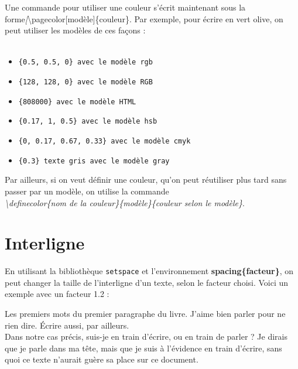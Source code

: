 \documentclass[a4paper, 10pt]{book}
\begin{document}
Une commande pour utiliser une couleur s'écrit maintenant sous la forme\textit[{\textbackslash pagecolor[modèle]\{couleur\}}. Par exemple, pour écrire en vert olive,  on peut utiliser les modèles de ces façons : \\ \\

\begin{itemize}
\item \textcolor[rgb]{0.5, 0.5, 0}{\texttt{\{0.5, 0.5, 0\} avec le modèle rgb}}
\item \textcolor[RGB]{128, 128, 0}{\texttt{\{128, 128, 0\} avec le modèle RGB}}
\item \textcolor[HTML]{808000}{\texttt{\{808000\} avec le modèle HTML}}
\item \textcolor[hsb]{0.17, 1, 0.5}{\texttt{\{0.17, 1, 0.5\} avec le modèle hsb}}
\item \textcolor[cmyk]{0, 0.17, 0.67, 0.33}{\texttt{\{0, 0.17, 0.67, 0.33\} avec le modèle cmyk}} \\
\item \textcolor[gray]{0.3}{\texttt{\{0.3\} texte gris avec le modèle gray}}\\ 
\end{itemize}

Par ailleurs, si on veut définir une couleur, qu'on peut réutiliser plus tard sans passer par un modèle, on utilise la commande \\ \textit{\textbackslash definecolor\{nom de la couleur\}\{modèle\}\{couleur selon le modèle\}}.

\section{Interligne}

En utilisant la bibliothèque \texttt{setspace} et l'environnement \textbf{spacing\{facteur\}}, on peut changer la taille de l'interligne d'un texte, selon le facteur choisi. Voici un exemple avec un facteur 1.2 :  \\ 

\begin{spacing}{1.2}
Les premiers mots du premier paragraphe du livre. J'aime bien parler pour ne rien dire. \'Ecrire aussi, par ailleurs. \\Dans notre cas précis, suis-je en train d'écrire, ou en train de parler ? Je dirais que je parle dans ma tête, mais que je suis à l'évidence en train d'écrire, sans quoi ce texte n'aurait guère sa place sur ce document.\\ 
\end{spacing}
\end{document}
